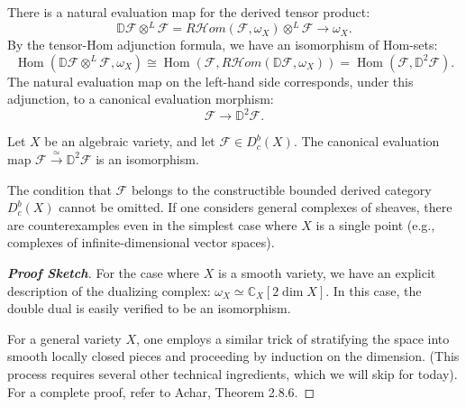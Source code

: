 There is a natural evaluation map for the derived tensor product:
\begin{equation*}
    \mathbb{D}\mathcal{F} \otimes^{L} \mathcal{F} = R\mathcal{H}om(\mathcal{F}, \omega_X) \otimes^{L} \mathcal{F} \longrightarrow \omega_X.
\end{equation*}
By the tensor-Hom adjunction formula, we have an isomorphism of Hom-sets:
\begin{equation*}
    \operatorname{Hom}(\mathbb{D}\mathcal{F} \otimes^{L} \mathcal{F}, \omega_X) \cong \operatorname{Hom}(\mathcal{F}, R\mathcal{H}om(\mathbb{D}\mathcal{F}, \omega_X)) = \operatorname{Hom}(\mathcal{F}, \mathbb{D}^2\mathcal{F}).
\end{equation*}
The natural evaluation map on the left-hand side corresponds, under this adjunction, to a canonical evaluation morphism:
\begin{equation*}
    \mathcal{F} \longrightarrow \mathbb{D}^2\mathcal{F}.
\end{equation*}

\begin{proposition}
Let $X$ be an algebraic variety, and let $\mathcal{F} \in D^b_c(X)$. The canonical evaluation map $\mathcal{F} \xrightarrow{\simeq} \mathbb{D}^2\mathcal{F}$ is an isomorphism.
\end{proposition}

\begin{remark}
The condition that $\mathcal{F}$ belongs to the constructible bounded derived category $D^b_c(X)$ cannot be omitted. If one considers general complexes of sheaves, there are counterexamples even in the simplest case where $X$ is a single point (e.g., complexes of infinite-dimensional vector spaces).
\end{remark}

\begin{proof}[\textbf{Proof Sketch}]
For the case where $X$ is a smooth variety, we have an explicit description of the dualizing complex: $\omega_X \simeq \mathbb{C}_X[2\dim X]$. In this case, the double dual is easily verified to be an isomorphism.

For a general variety $X$, one employs a similar trick of stratifying the space into smooth locally closed pieces and proceeding by induction on the dimension. (This process requires several other technical ingredients, which we will skip for today). For a complete proof, refer to Achar, Theorem 2.8.6.
\end{proof}



